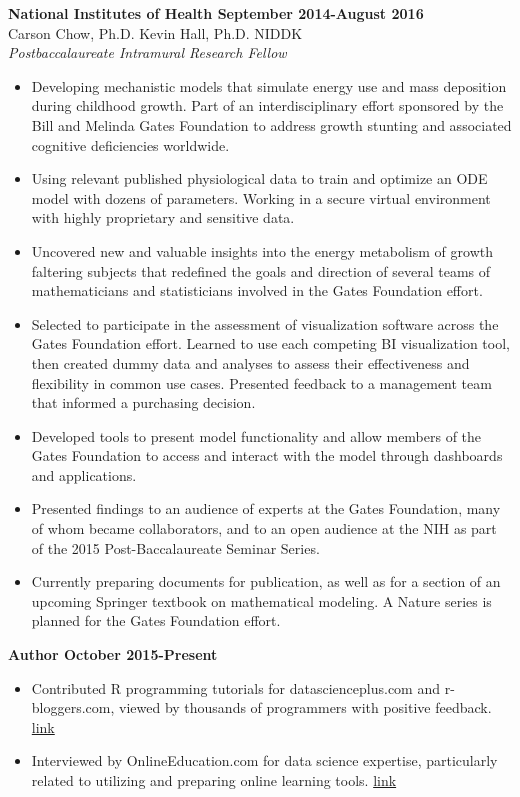 \documentclass[margin,10pt]{res} %
\begin{document}
\begin{resume}
\textbf{National Institutes of Health \hfill September 2014-August 2016} \\
Carson Chow, Ph.D. Kevin Hall, Ph.D. \hfill NIDDK \\
{\sl Postbaccalaureate Intramural Research Fellow} \\
\begin{itemize} %
\item Developing mechanistic models that simulate energy use and mass deposition during childhood growth. 
Part of an interdisciplinary effort sponsored by the Bill and Melinda Gates Foundation to address growth stunting and associated cognitive deficiencies worldwide.
\item Using relevant published physiological data to train and optimize an ODE model with dozens of parameters. Working in a secure virtual environment with highly proprietary and sensitive data.
\item Uncovered new and valuable insights into the energy metabolism of growth faltering subjects that redefined the goals and direction of several teams of mathematicians and statisticians involved in  the Gates Foundation effort.
\item Selected to participate in the assessment of visualization software across the Gates Foundation effort. Learned to use each competing BI visualization tool, then created dummy data and analyses to assess their effectiveness and flexibility in common use cases. Presented feedback to a management team that informed a purchasing decision.
\item Developed tools to present model functionality and allow members of the Gates Foundation to access and interact with the model through dashboards and applications.
\item Presented findings to an audience of experts at the Gates Foundation, many of whom became collaborators, and to an open audience at the NIH as part of the 2015 Post-Baccalaureate Seminar Series. 
\item Currently preparing documents for publication, as well as for a section of an upcoming Springer textbook on mathematical modeling. A Nature series is planned for the Gates Foundation effort.
\end{itemize}

\textbf{Author \hfill October 2015-Present} \\
\begin{itemize} %
\item Contributed R programming tutorials for datascienceplus.com and r-bloggers.com, viewed by thousands of programmers with positive feedback. \hfill \href{http://datascienceplus.com/author/aaron/}{link}
\item Interviewed by OnlineEducation.com for data science expertise, particularly related to utilizing and preparing online learning tools. \hfill \href{http://www.onlineeducation.com/expert-interviews/aaron-gowins-national-institutes-of-health}{link} 
\end{itemize}


\end{resume}
\end{document}

